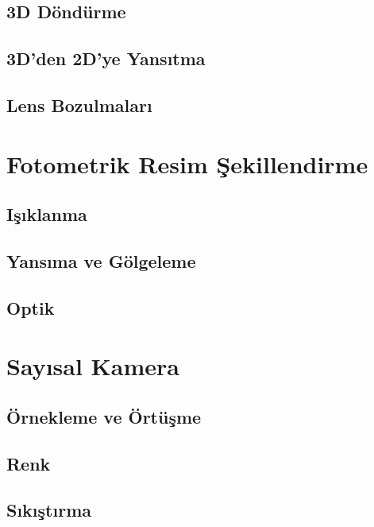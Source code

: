 \documentclass{beamer}
\begin{document}
\subsection{3D Döndürme}

\subsection{3D'den 2D'ye Yansıtma}

\subsection{Lens Bozulmaları}

\section{Fotometrik Resim Şekillendirme}

\subsection{Işıklanma}

\subsection{Yansıma ve Gölgeleme}

\subsection{Optik}

\section{Sayısal Kamera}

\subsection{Örnekleme ve Örtüşme}

\subsection{Renk}

\subsection{Sıkıştırma}
\end{document}
